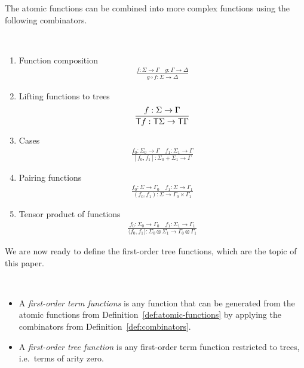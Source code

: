 The atomic functions can be combined into more complex functions using the following combinators.
\begin{definition}
     [Combinators] \label{def:combinators} \ 
    \begin{enumerate}
    \item Function composition
    \begin{align*}
    \frac{f : \Sigma \to \Gamma \quad g : \Gamma \to \Delta} {g \circ f : \Sigma \to \Delta}
\end{align*}

\item Lifting functions to trees
\begin{align*}
    \frac{f : \Sigma \to \Gamma} {\mathsf T f : \mathsf T \Sigma \to \mathsf T \Gamma}
\end{align*}
\item Cases
\begin{align*}
    \frac{f_0 : \Sigma_0 \to \Gamma \quad f_1 : \Sigma_1 \to \Gamma} {[f_0,f_1] : \Sigma_0 + \Sigma_1 \to \Gamma}
\end{align*}

\item Pairing functions
\begin{align*}
    \frac{f_0 : \Sigma \to \Gamma_0 \quad f_1 : \Sigma \to \Gamma_1} {(f_0,f_1) : \Sigma \to \Gamma_0 \times \Gamma_1}
\end{align*}

\item Tensor product of functions
\begin{align*}
    \frac{f_0 : \Sigma_0 \to \Gamma_0 \quad f_1 : \Sigma_1 \to \Gamma_1} {\langle f_0,f_1 \rangle : \Sigma_0 \otimes \Sigma_1 \to \Gamma_0 \otimes \Gamma_1}
\end{align*}
\end{enumerate}
\end{definition}

We are now ready to define the first-order tree functions, which are the topic of this paper. 

\begin{definition} \label{def:fo-tree-functions} \ 
    \begin{itemize}
        \item A \emph{first-order term functions} is any function that can be  generated from the atomic functions from Definition~\ref{def:atomic-functions} by applying the  combinators from Definition~\ref{def:combinators}.
        \item  A \emph{first-order tree function} is any first-order term function restricted to trees, i.e.~terms of arity zero.
    \end{itemize}    
\end{definition}


